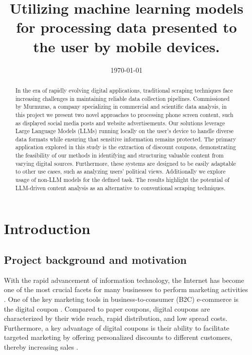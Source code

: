 \documentclass[licencjacka,en]{pracamgr}
\title{Utilizing machine learning models for processing data presented to the user by mobile devices.}
\date{\today}
\begin{document}
\maketitle

\begin{abstract}
In the era of rapidly evolving digital applications, traditional scraping techniques face increasing challenges in maintaining reliable data collection pipelines. Commissioned by Murmuras, a company specializing in commercial and scientific data analysis, in this project we present two novel approaches to processing phone screen content, such as displayed social media posts and website advertisements. Our solutions leverage Large Language Models (LLMs) running locally on the user's device to handle diverse data formats while ensuring that sensitive information remains protected. The primary application explored in this study is the extraction of discount coupons, demonstrating the feasibility of our methods in identifying and structuring valuable content from varying digital sources. Furthermore, these systems are designed to be easily adaptable to other use cases, such as analyzing users' political views. Additionally we explore usage of non-LLM models for the defined task. The results highlight the potential of LLM-driven content analysis as an alternative to conventional scraping techniques.
\raggedright
\end{abstract}

\tableofcontents
\listoffigures
\listoftables

\chapter{Introduction}

\section{Project background and motivation}
With the rapid advancement of information technology, the Internet has become one of the most crucial facets for many businesses to perform marketing activities \cite{design_of_coupons}. One of the key marketing tools in business-to-consumer (B2C) e-commerce is the digital coupon \cite{targeted_reminders}. Compared to paper coupons, digital coupons are characterized by their wide reach, rapid distribution, and low spread costs. Furthermore, a key advantage of digital coupons is their ability to facilitate targeted marketing by offering personalized discounts to different customers, thereby increasing sales \cite{design_of_coupons}.
\end{document}
